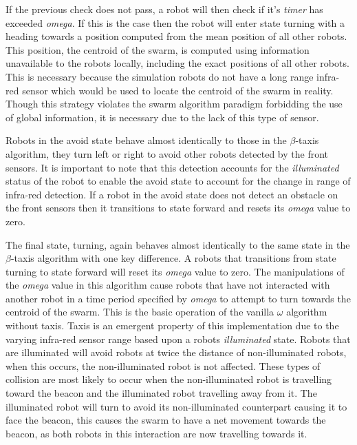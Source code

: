 \documentclass[conference]{IEEEtran}
\begin{document}
If the previous check does not pass, a robot will then check if it's \textit{timer} has exceeded \textit{omega}. If this is the case then the robot will enter state turning with a heading towards a position computed from the mean position of all other robots. This position, the centroid of the swarm, is computed using information unavailable to the robots locally, including the exact positions of all other robots. This is necessary because the simulation robots do not have a long range infra-red sensor which would be used to locate the centroid of the swarm in reality. Though this strategy violates the swarm algorithm paradigm forbidding the use of global information, it is necessary due to the lack of this type of sensor. 

Robots in the avoid state behave almost identically to those in the $\beta$-taxis algorithm, they turn left or right to avoid other robots detected by the front sensors. It is important to note that this detection accounts for the \textit{illuminated} status of the robot to enable the avoid state to account for the change in range of infra-red detection. If a robot in the avoid state does not detect an obstacle on the front sensors then it transitions to state forward and resets its \textit{omega} value to zero. 

The final state, turning, again behaves almost identically to the same state in the $\beta$-taxis algorithm with one key difference. A robots that transitions from state turning to state forward will reset its \textit{omega} value to zero. The manipulations of the \textit{omega} value in this algorithm cause robots that have not interacted with another robot in a time period specified by \textit{omega} to attempt to turn towards the centroid of the swarm. This is the basic operation of the vanilla $\omega$ algorithm without taxis. Taxis is an emergent property of this implementation due to the varying infra-red sensor range based upon a robots \textit{illuminated} state. Robots that are illuminated will avoid robots at twice the distance of non-illuminated robots, when this occurs, the non-illuminated robot is not affected. These types of collision are most likely to occur when the non-illuminated robot is travelling toward the beacon and the illuminated robot travelling away from it. The illuminated robot will turn to avoid its non-illuminated counterpart causing it to face the beacon, this causes the swarm to have a net movement towards the beacon, as both robots in this interaction are now travelling towards it.
\end{document}
